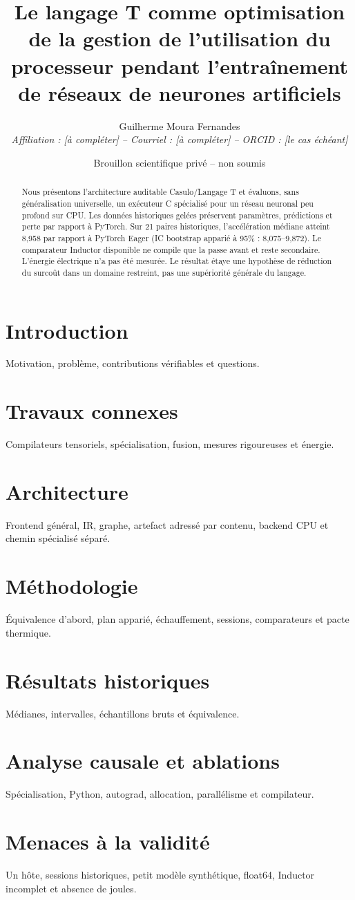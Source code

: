 \documentclass[11pt]{article}
\title{Le langage T comme optimisation de la gestion de l'utilisation du processeur pendant l'entraînement de réseaux de neurones artificiels}
\author{Guilherme Moura Fernandes\\\textit{Affiliation : [à compléter] -- Courriel : [à compléter] -- ORCID : [le cas échéant]}}
\date{Brouillon scientifique privé -- non soumis}
\begin{document}
\maketitle
\begin{abstract}
Nous présentons l'architecture auditable Casulo/Langage T et évaluons, sans généralisation universelle, un exécuteur C spécialisé pour un réseau neuronal peu profond sur CPU. Les données historiques gelées préservent paramètres, prédictions et perte par rapport à PyTorch. Sur 21 paires historiques, l'accélération médiane atteint 8,958 par rapport à PyTorch Eager (IC bootstrap apparié à 95\% : 8,075--9,872). Le comparateur Inductor disponible ne compile que la passe avant et reste secondaire. L'énergie électrique n'a pas été mesurée. Le résultat étaye une hypothèse de réduction du surcoût dans un domaine restreint, pas une supériorité générale du langage.
\end{abstract}
\section{Introduction} Motivation, problème, contributions vérifiables et questions.
\section{Travaux connexes} Compilateurs tensoriels, spécialisation, fusion, mesures rigoureuses et énergie.
\section{Architecture} Frontend général, IR, graphe, artefact adressé par contenu, backend CPU et chemin spécialisé séparé.
\section{Méthodologie} Équivalence d'abord, plan apparié, échauffement, sessions, comparateurs et pacte thermique.
\section{Résultats historiques} Médianes, intervalles, échantillons bruts et équivalence.
\section{Analyse causale et ablations} Spécialisation, Python, autograd, allocation, parallélisme et compilateur.
\section{Menaces à la validité} Un hôte, sessions historiques, petit modèle synthétique, float64, Inductor incomplet et absence de joules.
\end{document}
